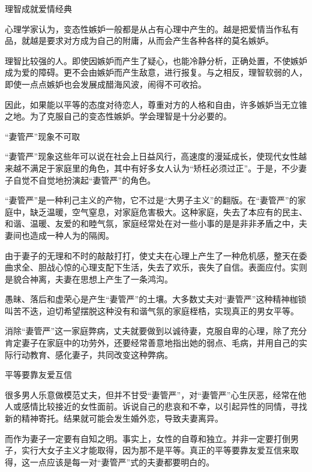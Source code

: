 \documentclass[12pt,UTF8]{ctexbook}
\begin{document}
理智成就爱情经典


心理学家认为，变态性嫉妒一般都是从占有心理中产生的。越是把爱情当作私有品，就越是要求对方成为自己的附庸，从而会产生各种各样的莫名嫉妒。

理智比较强的人。即使因嫉妒而产生了疑心，也能冷静分析，正确处置，不使嫉妒成为爱的障碍。更不会由嫉妒而产生敌意，进行报复。与之相反，理智软弱的人，即使一点点嫉妒也会发展成醋海风波，闹得不可收拾。

因此，如果能以平等的态度对待恋人，尊重对方的人格和自由，许多嫉妒当无立锥之地。为了克服自己的变态性嫉妒。学会理智是十分必要的。





“妻管严”现象不可取


“妻管严”现象这些年可以说在社会上日益风行，高速度的漫延成长，使现代女性越来越不满足于家庭里的角色，其中有好多女人认为“矫枉必须过正”。于是，不少妻子自觉不自觉地扮演起“妻管严”的角色。

“妻管严”是一种利己主义的产物，它不过是“大男子主义”的翻版。在“妻管严”的家庭中，缺乏温暖，空气窒息，对家庭危害极大。这种家庭，失去了本应有的民主、和谐、温暖、友爱的和睦气氛，家庭经常处在对一些小事的是是非非矛盾之中，夫妻间也造成一种人为的隔阂。

由于妻子的无理和不时的敲敲打打，使丈夫在心理上产生了一种危机感，整天在委曲求全、胆战心惊的心理支配下生活，失去了欢乐，丧失了自信。表面应付。实则是貌合神离，夫妻在思想上产生了一条鸿沟。

愚昧、落后和虚荣心是产生“妻管严”的土壤。大多数丈夫对“妻管严”这种精神枷锁叫苦不迭，迫切希望摆脱这种没有和谐气氛的家庭桎梏，实现真正的男女平等。

消除“妻管严”这一家庭弊病，丈夫就要做到以诚待妻，克服自卑的心理，除了充分肯定妻子在家庭中的功劳外，还要经常善意地指出她的弱点、毛病，并用自己的实际行动教育、感化妻子，共同改变这种弊病。





平等要靠友爱互信


很多男人乐意做模范丈夫，但并不甘受“妻管严”，对“妻管严”心生厌恶，经常在他人或感情比较接近的女性面前。诉说自己的悲哀和不幸，以引起异性的同情，寻找新的精神寄托。结果就可能会发生婚外恋，导致夫妻离异。

而作为妻子一定要有自知之明。事实上，女性的自尊和独立。并非一定要打倒男子，实行大女子主义才能取得，因为那不是平等。真正的平等要靠友爱互信来取得，这一点应该是每一对“妻管严”式的夫妻都要明白的。
\end{document}
